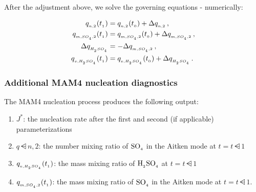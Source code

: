 After the adjustment above, we solve the governing equations
- numerically:

\begin{align}
  q_{_{n,2}} (t_{_{1}}) &= q_{_{n,2}} (t_{_{0}}) + \Delta q_{_{n,2}} \,, \\
  q_{_{m,SO_{_4},2}} (t_{_{1}}) &= q_{_{m,SO_{_4},2}} (t_{_{0}}) + \Delta q_{_{m,SO_{_4},2}} \,, \\
  \Delta q_{_{H_{_2}SO_{_4}}} &= -\Delta q_{_{m,SO_{_4},2}} \,, \\
  q_{_{v,H_{_2}SO_{_4}}} (t_{_{1}}) &= q_{_{v,H_{_2}SO_{_4}}} (t_{_{0}}) + \Delta q_{_{H_{_2}SO_{_4}}} \,.
\end{align}

\subsubsection{Additional MAM4 nucleation diagnostics} \label{output}

The MAM4 nucleation process produces the following output:

\begin{enumerate}
  \item $J^*$: the nucleation rate after the first and second (if applicable)
        parameterizations
  \item $q\dsub{n,2}$: the number mixing ratio of $\rm SO_{_4}$ in the Aitken mode at
        $t = t\dsub1$
  \item $q_{_{v,H_{_2}SO_{_4}}} (t_{_{1}})$: the mass mixing ratio of $\rm H_{_2}SO_{_4}$ at
        $t = t\dsub1$
  \item $q_{_{m,SO_{_4},2}} (t_{_{1}})$: the mass mixing ratio of $\rm SO_{_4}$ in the
        Aitken mode at $t = t\dsub1$.
\end{enumerate}

